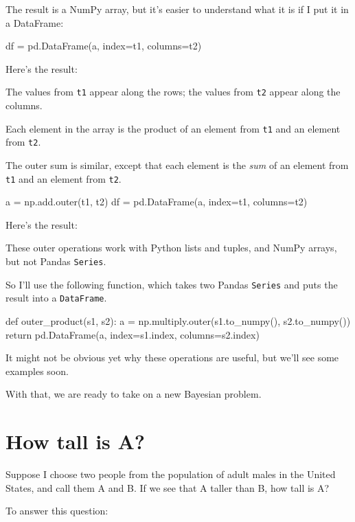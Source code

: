 \documentclass[12pt]{book}
\theoremstyle{exercise}
\newcommand{\py}[1]{{\tt #1}}%
\begin{document}
The result is a NumPy array, but it's easier to understand what it is if I put it in a DataFrame:

\begin{code}
df = pd.DataFrame(a, index=t1, columns=t2)
\end{code}

Here's the result:



The values from \py{t1} appear along the rows; the values from \py{t2} appear along the columns.

Each element in the array is the product of an element from \py{t1} and an element from \py{t2}.

The outer sum is similar, except that each element is the {\em sum} of an element from \py{t1} and an element from \py{t2}.

\begin{code}
a = np.add.outer(t1, t2)
df = pd.DataFrame(a, index=t1, columns=t2)
\end{code}

Here's the result:



These outer operations work with Python lists and tuples, and NumPy arrays, but not Pandas \py{Series}.

So I'll use the following function, which takes two Pandas \py{Series} and puts the result into a \py{DataFrame}.

\begin{code}
def outer_product(s1, s2):
    a = np.multiply.outer(s1.to_numpy(), s2.to_numpy())
    return pd.DataFrame(a, index=s1.index, columns=s2.index)
\end{code}

It might not be obvious yet why these operations are useful, but we'll see some examples soon.

With that, we are ready to take on a new Bayesian problem.

\section{How tall is A?}

Suppose I choose two people from the population of adult males in the United States, and call them A and B.  If we see that A taller than B, how tall is A?

To answer this question:
\end{document}
